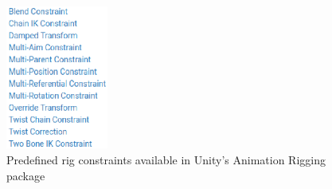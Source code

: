 \begin{figure}
    \centering
    \includegraphics[width=0.3\textwidth]{grafika/ar_constraints.eps}
    \caption{Predefined rig constraints available in Unity's Animation Rigging
    package \cite{ar_constraints}}
    \label{fig:ar_constraints}
\end{figure}

